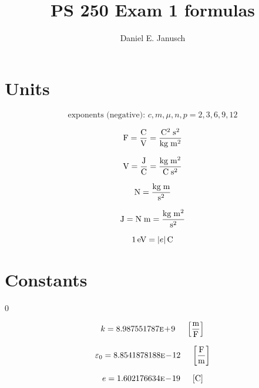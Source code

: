 \documentclass[12pt]{article}
\newcommand \E [1] {\textsc{e}\!#1\!}
\begin{document}

\title{PS 250 Exam 1 formulas}
\author{Daniel E. Janusch}
\maketitle

\section{Units}
\begin{equation}
	\textrm{exponents (negative): } c, m, \mu, n, p = 2, 3, 6, 9, 12
\end{equation}

\begin{equation}
	{\rm F} = \dfrac{\rm C}{\rm V} = \dfrac{{\rm C}^2\;{\rm s}^2}{{\rm kg}\;{\rm m}^2}
\end{equation}

\begin{equation}
	{\rm V} = \dfrac{\rm J}{\rm C} = \dfrac{{\rm kg} \; {\rm m}^2}{{\rm C} \; {\rm s}^2}
\end{equation}

\begin{equation}
	{\rm N} = \dfrac{{\rm kg} \; {\rm m}}{{\rm s}^2}
\end{equation}

\begin{equation}
	{\rm J} = {\rm N} \; {\rm m} = \dfrac{{\rm kg} \; {\rm m}^2}{{\rm s}^2}
\end{equation}

\begin{equation}
	1\,{\rm eV} = |e|\,{\rm C}
\end{equation}

\section{Constants}
\setcounter {equation} 0

\begin{equation}
	k = 8.987551787\E+9 ~~~~ \left[\dfrac{\rm m}{\rm F}\right]
\end{equation}

\begin{equation}
	\varepsilon_0 = 8.8541878188\E-12 ~~~~ \left[\dfrac{\rm F}{\rm m}\right]
\end{equation}

\begin{equation}
	e = 1.602176634\E-19 ~~~~ \left[{\rm C}\right]
\end{equation}
\end{document}
